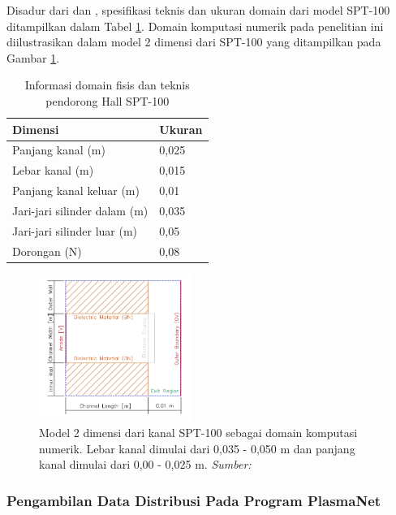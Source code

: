 Disadur dari \cite{braga_miranda_2019} dan \cite{f_taccogna_longo_capitelli_schneider_2005},
spesifikasi teknis dan ukuran domain dari model SPT-100 ditampilkan dalam Tabel
\ref{spt_100}. Domain komputasi numerik pada penelitian ini diilustrasikan dalam
model 2 dimensi dari SPT-100 yang ditampilkan pada Gambar \ref{spt_100_2d}.

\begin{table}[h!]
  \centering
  \caption{Informasi domain fisis dan teknis pendorong Hall SPT-100 }
  \label{spt_100}
  \begin{tabular}{ll}
    \hline
    \textbf{Dimensi}             & \textbf{Ukuran} \\
    \hline
    Panjang kanal (m)            & 0,025           \\
    \hline
    Lebar kanal (m)              & 0,015           \\
    \hline
    Panjang kanal keluar (m)     & 0,01            \\
    \hline
    Jari-jari silinder dalam (m) & 0,035           \\
    \hline
    Jari-jari silinder luar (m)  & 0,05            \\
    \hline
    Dorongan (N)                 & 0,08            \\
    \hline
  \end{tabular}
\end{table}

\begin{figure}[h!]
  \centering
  \includegraphics[width=5cm]{gambar/spt_100_2d.png}
  \caption{Model 2 dimensi dari kanal SPT-100 sebagai domain komputasi numerik. Lebar
  kanal dimulai dari 0,035 - 0,050 m dan panjang kanal dimulai dari 0,00 - 0,025
  m. \emph{ Sumber: \citep{braga_miranda_2019}}}
  \label{spt_100_2d}
\end{figure}

\subsubsection{Pengambilan Data Distribusi Pada Program PlasmaNet}

